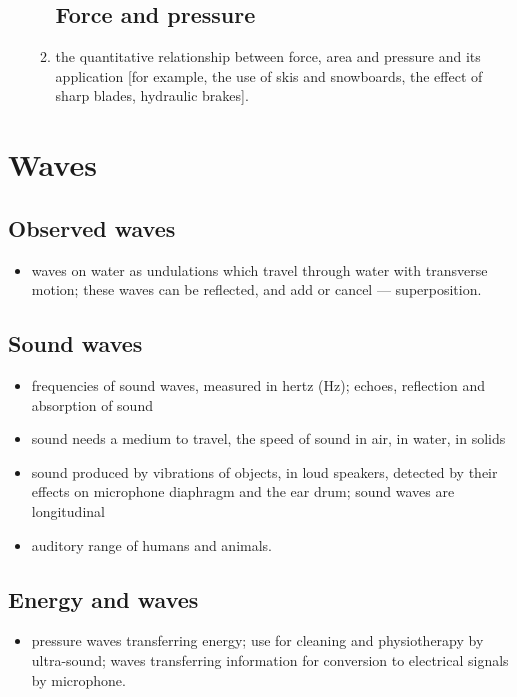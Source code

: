 \documentclass[10pt]{article}
\begin{document}
\begin{paracol}{2}
\begin{enumerate}
\begin{enumerate}
\subsection{Force and pressure}
\item the quantitative relationship between force, area and pressure and its
application [for example, the use of skis and snowboards, the effect of sharp
blades, hydraulic brakes].
\end{enumerate}
\end{enumerate}

\switchcolumn*

\section{Waves}
\subsection{Observed waves}
\begin{itemize}
\item waves on water as undulations which travel through water with transverse motion;
these waves can be reflected, and add or cancel --- superposition.
\end{itemize}

\subsection{Sound waves}
\begin{itemize}
\item frequencies of sound waves, measured in hertz (Hz); echoes, reflection and absorption
of sound
\item sound needs a medium to travel, the speed of sound in air, in water, in solids
\item sound produced by vibrations of objects, in loud speakers, detected by their effects on
microphone diaphragm and the ear drum; sound waves are longitudinal
\item auditory range of humans and animals.
\end{itemize}

\subsection{Energy and waves}
\begin{itemize}
\item pressure waves transferring energy; use for cleaning and physiotherapy by ultra-sound;
waves transferring information for conversion to electrical signals by microphone.
\end{itemize}


\end{paracol}
\end{document}
